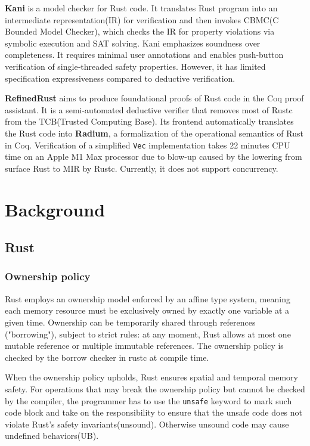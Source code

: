 \documentclass[conference]{IEEEtran}
\begin{document}
\textbf{Kani}\cite{kani} is a model checker for Rust code. It translates Rust program into an intermediate representation(IR) for verification and then invokes CBMC(C Bounded Model Checker)\cite{kroening2023cbmccboundedmodel}, which checks the IR for property violations via symbolic execution and SAT solving. Kani emphasizes soundness over completeness. It requires minimal user annotations and enables push-button verification of single‑threaded safety properties. However, it has limited specification expressiveness compared to deductive verification.   

\textbf{RefinedRust}\cite{RefinedRust} aims to produce foundational proofs of Rust code in the Coq proof assistant. It is a semi-automated deductive verifier that removes most of Rustc from the TCB(Trusted Computing Base). Its frontend automatically translates the Rust code into \textbf{Radium}, a formalization of the operational semantics of Rust in Coq. Verification of a simplified \texttt{Vec} implementation takes 22 minutes CPU time on an Apple M1 Max processor due to blow-up caused by the lowering from surface Rust to MIR by Rustc. Currently, it does not support concurrency.    




\section{Background}

\subsection{Rust}
\subsubsection{Ownership policy}
Rust employs an ownership model enforced by an affine type system, meaning each memory resource must be exclusively owned by exactly one variable at a given time. Ownership can be temporarily shared through references ("borrowing"), subject to strict rules: at any moment, Rust allows at most one mutable reference or multiple immutable references. The ownership policy is checked by the borrow checker in rustc at compile time.

When the ownership policy upholds, Rust ensures spatial and temporal memory safety. For operations that may break the ownership policy but cannot be checked by the compiler, the programmer has to use the \texttt{unsafe} keyword to mark such code block and take on the responsibility to ensure that the unsafe code does not violate Rust's safety invariants(unsound). Otherwise unsound code may cause undefined behaviors(UB).
\end{document}
